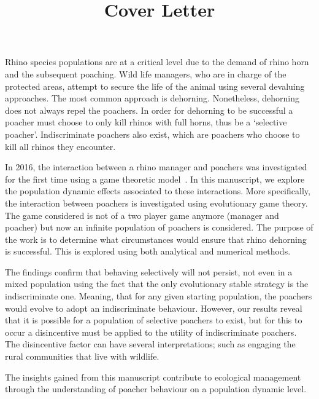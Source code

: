 \documentclass[10pt]{article}
\title{Cover Letter}
\date{}
\begin{document}
\maketitle

Rhino species populations are at a critical level due to the demand of rhino horn
and the subsequent poaching. Wild life managers, who are in charge of the protected
areas, attempt to secure the life of the animal using several devaluing approaches.
The most common approach is dehorning. Nonetheless, dehorning does not always repel
the poachers. In order for dehorning to be successful a poacher must choose to only
kill rhinos with full horns, thus be a `selective poacher'. Indiscriminate poachers
also exist, which are poachers who choose to kill all rhinos they encounter.

In 2016, the interaction between a rhino manager and poachers was investigated for
the first time using a game theoretic model~\cite{Lee}. 
In this manuscript, we explore the population dynamic effects associated to these
interactions. More specifically, the interaction between poachers is investigated
using evolutionary game theory. The game considered is not of a two player game
anymore (manager and poacher) but now an infinite population of poachers is considered. 
The purpose of the work is to determine what circumstances would ensure that rhino
dehorning is successful. This is explored using both analytical and numerical methods.

The findings confirm that behaving selectively will not persist, not even in a
mixed population using the fact that the only evolutionary stable strategy is the
indiscriminate one. Meaning, that for any given starting population, the poachers
would evolve to adopt an indiscriminate behaviour. However, our results reveal
that it is possible for a population of selective poachers to exist, but for this
to occur a disincentive must be applied to the utility of indiscriminate poachers.
The disincentive factor can have several interpretations; such as engaging the
rural communities that live with wildlife.

The insights gained from this manuscript contribute to ecological management through
the understanding of poacher behaviour on a population dynamic level.



\end{document}
